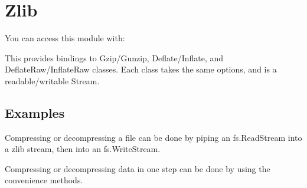 \section{Zlib}\label{zlib}

\begin{Shaded}
\begin{Highlighting}[]
 
\end{Highlighting}
\end{Shaded}

You can access this module with:

\begin{Shaded}
\begin{Highlighting}[]
 \NormalTok{(}\NormalTok{);}
\end{Highlighting}
\end{Shaded}

This provides bindings to Gzip/Gunzip, Deflate/Inflate, and
DeflateRaw/InflateRaw classes. Each class takes the same options, and is
a readable/writable Stream.

\subsection{Examples}\label{examples}

Compressing or decompressing a file can be done by piping an
fs.ReadStream into a zlib stream, then into an fs.WriteStream.

\begin{Shaded}
\begin{Highlighting}[]
 \NormalTok{();}
 \NormalTok{(}\NormalTok{);}
 \NormalTok{(}\NormalTok{);}
 \NormalTok{(}\NormalTok{);}

\end{Highlighting}
\end{Shaded}

Compressing or decompressing data in one step can be done by using the
convenience methods.

